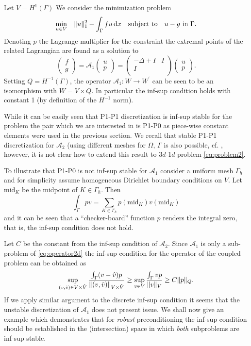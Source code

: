 Let $V=H^1{(\Gamma)}$ We consider the minimization problem
\[
\min_{u\in V}\quad\lVert{u}\rVert^2_1 - \int_{\Gamma}f u\,\mathrm{d}x\quad\mbox{subject to}\quad
u-g\mbox{ in }\Gamma.
\]
Denoting $p$ the Lagrange multiplier for the constraint the extremal points
of the related Lagrangian are found as a solution to
%
\begin{equation}\label{eq:A1}
\begin{pmatrix}f\\g\end{pmatrix}=
\mathcal{A}_1\begin{pmatrix}u\\p\end{pmatrix}=
%
\begin{pmatrix}
  -\Delta + I & I\\
  I           &  \\
\end{pmatrix}
\begin{pmatrix}u\\p\end{pmatrix}.
\end{equation}
%
Setting $Q=H^{-1}(\Gamma)$, the operator $\mathcal{A}_1:W\rightarrow W^{\prime}$
can be seen to be an isomorphism with $W=V\times Q$. In particular the inf-sup
condition holds with constant 1 (by definition of the $H^{-1}$ norm).

While it can be easily seen that P1-P1 discretization is inf-sup stable for
the problem the pair which we are interested in is P1-P0 as piece-wise constant
elements were used in the previous section. We recall that stable P1-P1 discretization
for $\mathcal{A}_2$ (using different meshes for $\Omega$, $\Gamma$ is also possible,
cf. \cite{burman2009interior}, however, it is not clear how to extend this result
to 3$d$-1$d$ problem \eqref{eq:problem2}.

To illustrate that P1-P0 is not inf-sup stable for $\mathcal{A}_1$ consider
a uniform mesh $\Gamma_h$ and for simplicity assume homogeneous Dirichlet
boundary conditions on $V$. Let $\text{mid}_{K}$ be the midpoint of $K\in\Gamma_h$.
Then 
\[
\int_{\Gamma} p v = \sum_{K\in{\Gamma}_h}p(\text{mid}_{K})v(\text{mid}_{K})
\]
and it can be seen that a ``checker-board'' function $p$ renders the integral
zero, that is, the inf-sup condition does not hold.

Let $C$ be the constant from the inf-sup condition of $\mathcal{A}_2$. 
Since $\mathcal{A}_1$ is only a sub-problem of \eqref{eq:operator2d} the
inf-sup condition for the operator of the coupled problem can be obtained as
\[
\sup_{(v,\hat{v})\in V\times \hat{V}}\frac{\int_{\Gamma}(v-\hat{v}) p}{\lVert{(v,\hat{v})}\rVert_{V\times \hat{V}}}
\geq
\sup_{v\in V}\frac{\int_{\Gamma}v p}{\lVert{v}\rVert_{V}}
\geq
C\lVert{p}\rVert_Q.
\]
If we apply similar argument to the discrete inf-sup condition it seems
that the unstable discretization of $\mathcal{A}_1$ does not present issue.
We shall now give an example which demonstrates that for \emph{robust} preconditioning
the inf-sup condition should be established in the (intersection) space in which \emph{both}
subproblems are inf-sup stable.

